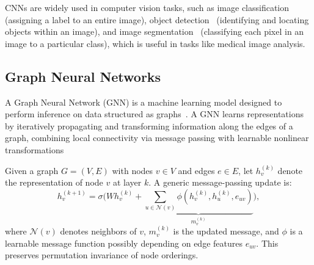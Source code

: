 CNNs are widely used in computer vision tasks, such as
image classification~\cite{lecun2002gradient,krizhevsky2012imagenet} (assigning a label to an entire image), object detection~\cite{redmon2016you} (identifying and locating objects within an image), and image segmentation~\cite{long2015fully,ronneberger2015u} (classifying each pixel in an image to a particular class), which is useful in tasks like medical image analysis.










\subsection{Graph Neural Networks}

A Graph Neural Network (GNN) is a machine learning model designed to perform inference on data structured as graphs~\cite{scarselli2008graph,Kipf2017}. A GNN learns representations by iteratively propagating and transforming information along the edges of a graph, combining local connectivity via message passing with learnable nonlinear transformations

Given a graph $G=(V,E)$ with nodes $v \in V$ and edges $e \in E$,
let $h_{v}^{(k)}$ denote the representation of node $v$ at layer $k$.
A generic message-passing update is:
\begin{equation}
    \label{GNN}
h_{v}^{(k+1)} = \sigma \Big( W  h_v^{(k)} + \underbrace{\sum_{u \in \mathcal{N}(v)} \phi(h_v^{(k)}, h_u^{(k)}, e_{uv})}_{m_v^{(k)}} \Big),
\end{equation}
where $\mathcal{N}(v)$ denotes neighbors of $v$, $m_v^{(k)}$ is the updated message, and $\phi$ is a learnable message function possibly depending on edge features $e_{uv}$. This preserves  permutation invariance of node orderings. 

